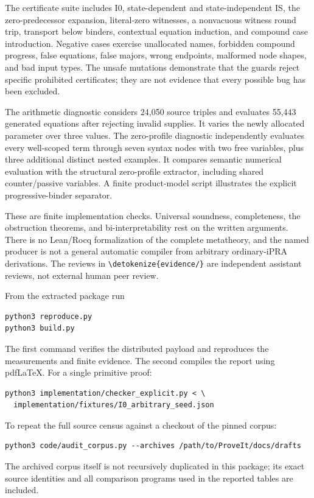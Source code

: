 \documentclass[11pt,letterpaper]{article}
\theoremstyle{definition}\newtheorem{definition}[theorem]{Definition}
\theoremstyle{remark}\newtheorem{remark}[theorem]{Remark}
\newcommand{\file}[1]{\expandafter\nolinkurl\expandafter{\detokenize{#1}}}
\begin{document}
The certificate suite includes I0, state-dependent and state-independent
IS, the zero-predecessor expansion, literal-zero witnesses, a nonvacuous
witness round trip, transport below binders, contextual equation
induction, and compound case introduction. Negative cases exercise
unallocated names, forbidden compound progress, false equations, false
majors, wrong endpoints, malformed node shapes, and bad input types.
The unsafe mutations demonstrate that the guards reject specific
prohibited certificates; they are not evidence that every possible bug
has been excluded.

The arithmetic diagnostic considers 24,050 source triples and evaluates
55,443 generated equations after rejecting invalid supplies. It varies
the newly allocated parameter over three values. The zero-profile
diagnostic independently evaluates every well-scoped term through seven
syntax nodes with two free variables, plus three additional distinct
nested examples. It compares semantic numerical evaluation with the
structural zero-profile extractor, including shared counter/passive
variables. A finite product-model script illustrates the explicit
progressive-binder separator.

These are finite implementation checks. Universal soundness, completeness,
the obstruction theorems, and bi-interpretability rest on the written
arguments. There is no Lean/Rocq formalization of the complete metatheory,
and the named producer is not a general automatic compiler from arbitrary
ordinary-iPRA derivations. The reviews in \file{evidence/} are independent
assistant reviews, not external human peer review.

From the extracted package run
\begin{lstlisting}
python3 reproduce.py
python3 build.py
\end{lstlisting}
The first command verifies the distributed payload and reproduces the
measurements and finite evidence. The second compiles the report using
pdfLaTeX. For a single primitive proof:
\begin{lstlisting}
python3 implementation/checker_explicit.py < \
  implementation/fixtures/I0_arbitrary_seed.json
\end{lstlisting}
To repeat the full source census against a checkout of the pinned corpus:
\begin{lstlisting}
python3 code/audit_corpus.py --archives /path/to/ProveIt/docs/drafts
\end{lstlisting}
The archived corpus itself is not recursively duplicated in this package;
its exact source identities and all comparison programs used in the
reported tables are included.
\end{document}
